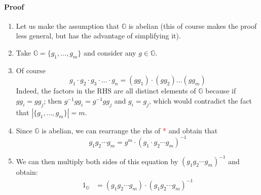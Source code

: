 \documentclass[../main]{subfiles}
\begin{document}
\paragraph{Proof}
	\begin{enumerate}
		\item Let us make the assumption that $\mathbb{G}$ is abelian (this of course makes the proof less general, but has the advantage of simplifying it).
		\item Take $\mathbb{G} = \{g_1, \ldots, g_m\}$ and consider any $g \in{} \mathbb{G}$.
		\item Of course
				$$g_1 \cdot{} g_2 \cdot{} g_3 \cdot{} \ldots{} \cdot{} g_n = (gg_1)\cdot{}(gg_2)\ldots(gg_m)$$
				Indeed, the factors in the RHS are all distinct elements of $\mathbb{G}$ because if $gg_i = gg_j$; then $g^{-1}gg_i = g^{-1}gg_j$ and $g_i = g_j$, which would contradict the fact that $|\{g_1, \ldots, g_m\}| = m$.
		\item Since $\mathbb{G}$ is abelian, we can rearrange the rhs of \textcolor{red}{*} and obtain that
				$$g_1g_2 \cdots{} g_m = g^m \cdot{} (g_1 \cdot{} g_2 \cdots g_m)^{-1}$$
		\item We can then multiply both sides of this equation by $(g_1 g_2 \cdots{} g_m)^{-1}$ and obtain:
				\begin{align*}
					1_{\mathbb{G}} &= (g_1 g_2 \cdots{} g_m) \cdot (g_1 g_2 \cdots{} g_m)^{-1}
				\end{align*}
	\end{enumerate}
\end{document}
